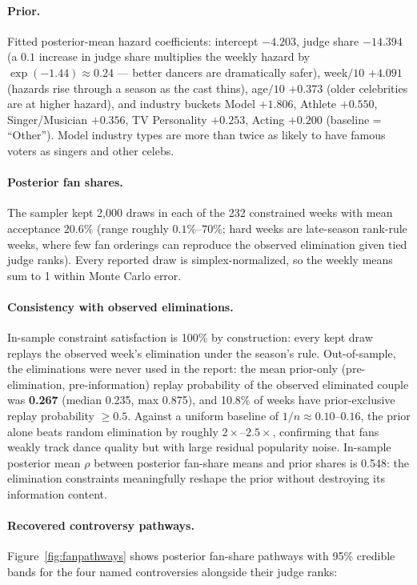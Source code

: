 \documentclass[11pt]{article}
\begin{document}
\paragraph{Prior.} Fitted posterior-mean hazard coefficients:
intercept $-4.203$, judge share $-14.394$ (a $0.1$ increase in judge share
multiplies the weekly hazard by $\exp(-1.44) \approx 0.24$ --- better dancers
are dramatically safer), week$/10$ $+4.091$ (hazards rise through a season
as the cast thins), age$/10$ $+0.373$ (older celebrities are at higher
hazard), and industry buckets Model $+1.806$, Athlete $+0.550$,
Singer/Musician $+0.356$, TV Personality $+0.253$, Acting $+0.200$
(baseline = ``Other''). Model industry types are more than twice as likely
to have famous voters as singers and other celebs.

\paragraph{Posterior fan shares.} The sampler kept 2{,}000 draws in each of
the 232 constrained weeks with mean acceptance $20.6\%$ (range roughly
$0.1\%$--$70\%$; hard weeks are late-season rank-rule weeks, where few fan
orderings can reproduce the observed elimination given tied judge ranks).
Every reported draw is simplex-normalized, so the weekly means sum to 1
within Monte Carlo error.

\paragraph{Consistency with observed eliminations.} In-sample constraint
satisfaction is 100\% by construction: every kept draw replays the observed
week's elimination under the season's rule. Out-of-sample, the eliminations
were never used in the report: the mean prior-only (pre-elimination,
pre-information) replay probability of the observed eliminated couple was
\textbf{0.267} (median 0.235, max 0.875), and 10.8\% of weeks have
prior-exclusive replay probability $\ge 0.5$. Against a uniform baseline of
$1/n \approx 0.10$--$0.16$, the prior alone beats random elimination by
roughly $2 \times$--$2.5\times$, confirming that fans weakly track
dance quality but with large residual popularity noise. In-sample posterior
mean $\rho$ between posterior fan-share means and prior shares is 0.548:
the elimination constraints meaningfully reshape the prior without
destroying its information content.

\paragraph{Recovered controversy pathways.} Figure~\ref{fig:fanpathways}
shows posterior fan-share pathways with 95\% credible bands for the four
named controversies alongside their judge ranks:
\end{document}
